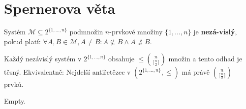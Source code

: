 \section{Spernerova věta}

\begin{definice}
	Systém $\mathcal{M} \subseteq 2^{ \{ 1, \dots , n \} }$ podmnožin $n$-prvkové množiny $\{ 1, \dots , n \}$ je \textbf{nezá-\newline vislý}, pokud platí: $\forall A, B \in \mathcal{M}, A \neq B: A \nsubseteq B \land A \nsupseteq B$.
\end{definice}

\begin{veta}
	Každý nezávislý systém v $2^{ \{ 1, \dots , n \} }$ obsahuje $\leq \binom{n}{\lceil \frac{n}{2}\rceil}$ množin a tento odhad je těsný. Ekvivalentně: Nejdelší antiřetězec v $(2^{ \{ 1, \dots , n \} }, \leq)$ má právě $\binom{n}{\lceil \frac{n}{2}\rceil}$ prvků.
\end{veta}

\begin{dukaz}
	Empty.
\end{dukaz}